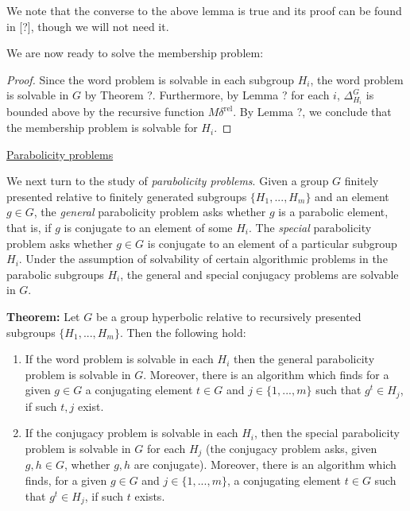 \documentclass[12pt]{article}
\newcommand{\vs}{\vskip10pt}
\begin{document}
	We note that the converse to the above lemma is true and its proof can be found in [?], though we will not need it. 
	
	\vs
	
	We are now ready to solve the membership problem: 
	
	\vs 
	
	\begin{proof}
		
		Since the word problem is solvable in each subgroup $H_i$, the word problem is solvable in $G$ by Theorem ?. Furthermore, by Lemma ? for each $i$, $\Delta_{H_i}^G$ is bounded above by the recursive function $M \delta^{\text{rel}}$. By Lemma ?, we conclude that the membership problem is solvable for $H_i$.
		
	\end{proof}

	\underline{Parabolicity problems}
	
	\vs 
	
	We next turn to the study of \textit{parabolicity problems}. Given a group $G$ finitely presented relative to finitely generated subgroups $\{H_1,...,H_m\}$ and an element $g \in G$, the \textit{general} parabolicity problem asks whether $g$ is a parabolic element, that is, if $g$ is conjugate to an element of some $H_i$. The \textit{special} parabolicity problem asks whether $g \in G$ is conjugate to an element of a particular subgroup $H_i$. Under the assumption of solvability of certain algorithmic problems in the parabolic subgroups $H_i$, the general and special conjugacy problems are solvable in $G$. 
	
	\vs 
	
	\textbf{Theorem: } Let $G$ be a group hyperbolic relative to recursively presented subgroups $\{H_1,...,H_m\}$. Then the following hold: 
	
	\begin{enumerate}[label = (\alph*)]
		\item If the word problem is solvable in each $H_i$ then the general parabolicity problem is solvable in $G$. Moreover, there is an algorithm which finds for a given $g \in G$ a conjugating element $t \in G$ and $j \in \{1,...,m\}$ such that $g^t \in H_j$, if such $t,j$ exist. 
		\item If the conjugacy problem is solvable in each $H_i$, then the special parabolicity problem is solvable in $G$ for each $H_j$ (the conjugacy problem asks, given $g,h \in G$, whether $g,h$ are conjugate). Moreover, there is an algorithm which finds, for a given $g \in G$ and $j \in \{1,...,m\}$, a conjugating element $t \in G$ such that $g^t \in H_j$, if such $t$ exists. 
	\end{enumerate}
\end{document}
